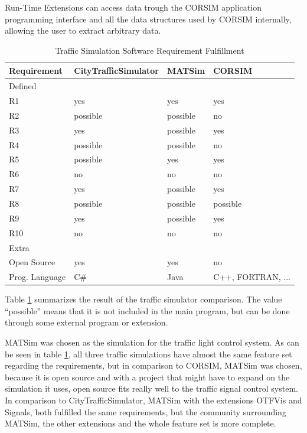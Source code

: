 Run-Time Extensions can access data trough the CORSIM application programming interface and all the data structures used by CORSIM internally, allowing the user to extract arbitrary data.\cite{corSimRte}

\begin{table}[!ht]
  	\centering
  	\begin{tabular}{l|l|l|l}
		Requirement & CityTrafficSimulator & MATSim & CORSIM \\
		 \hline\hline
		Defined \\
		\hline
		R1 & yes & yes & yes \\
		R2 & possible & possible & no \\
		R3 & yes & possible & yes \\
		R4 & possible & possible & no \\
		R5 & possible & yes & yes \\
		R6 & no & no & no \\
		R7 & yes & possible & yes \\
		R8 & possible & possible & possible \\
		R9 & yes & possible & yes \\
		R10 & no & no & no \\
		\hline\hline
		Extra \\
		\hline
		Open Source & yes & yes & no \\
		Prog. Language & C\# & Java & C++, FORTRAN, ... \\
	\end{tabular}
  	\caption{Traffic Simulation Software Requirement Fulfillment}
  	\label{simulationRequirementsComparison}
\end{table}

Table \ref{simulationRequirementsComparison} summarizes the result of the traffic simulator comparison. The value ``possible'' means that it is not included in the main program, but can be done through some external program or extension.

MATSim was chosen as the simulation for the traffic light control system. As can be seen in table \ref{simulationRequirementsComparison}, all three traffic simulations have almost the same feature set regarding the requirements, but in comparison to CORSIM, MATSim was chosen, because it is open source and with a project that might have to expand on the simulation it uses, open source fits really well to the traffic signal control system. In comparison to CityTrafficSimulator, MATSim with the extensions OTFVis and Signals, both fulfilled the same requirements, but the community surrounding MATSim, the other extensions and the whole feature set is more complete.

